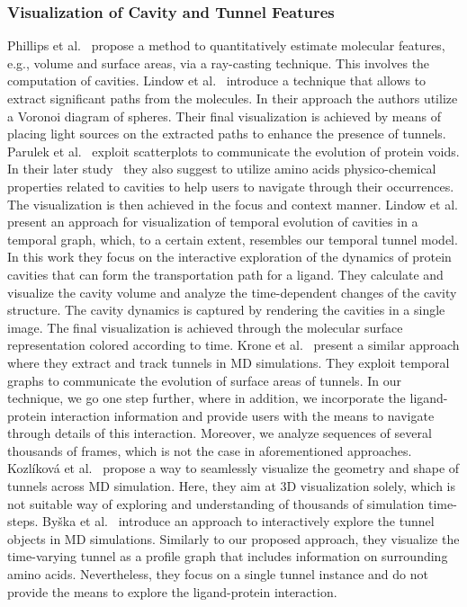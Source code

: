 \documentclass[twocolumn]{bmcart}%
\begin{document}
\subsubsection*{Visualization of Cavity and Tunnel Features}
Phillips et al.~\cite{phillips2010} propose a method to quantitatively estimate molecular features, e.g., volume and surface areas, via a ray-casting technique. 
This involves the computation of cavities.
Lindow et al.~\cite{LindowBH11} introduce a technique that allows to extract significant paths from the molecules. 
In their approach the authors utilize a Voronoi diagram of spheres. 
Their final visualization is achieved by means of placing light sources on the extracted paths to enhance the presence of tunnels.
Parulek et al.~\cite{parulek2012} exploit scatterplots to communicate the evolution of protein voids. 
In their later study~\cite{parulek2013} they also suggest to utilize amino acids physico-chemical properties related to cavities to help users to navigate through their occurrences. 
The visualization is then achieved in the focus and context manner.
Lindow et al. \cite{Lindow2013} present an approach for visualization of temporal evolution of cavities in a temporal graph, which, to a certain extent, resembles our temporal tunnel model. 
In this work they focus on the interactive exploration of the dynamics of protein cavities that can form the transportation path for a ligand. 
They calculate and visualize the cavity volume and analyze the time-dependent changes of the cavity structure.
The cavity dynamics is captured by rendering the cavities in a single image. 
The final visualization is achieved through the molecular surface representation colored according to time. 
Krone et al.~\cite{krone2013features} present a similar approach where they extract and track tunnels in MD simulations. 
They exploit temporal graphs to communicate the evolution of surface areas of tunnels. 
In our technique, we go one step further, where in addition, we incorporate the ligand-protein interaction information and provide users with the means to navigate through details of this interaction. 
Moreover, we analyze sequences of several thousands of frames, which is not the case in aforementioned approaches.
Kozl\'{i}kov\'{a} et al.~\cite{kozlikova2014vcbm} propose a way to seamlessly visualize the geometry and shape of tunnels across MD simulation. 
Here, they aim at 3D visualization solely, which is not suitable way of exploring and understanding of thousands of simulation time-steps.
By\v{s}ka et al.~\cite{byska2016} introduce an approach to interactively explore the tunnel objects in MD simulations. 
Similarly to our proposed approach, they visualize the time-varying tunnel as a profile graph that includes information on surrounding amino acids. 
Nevertheless, they focus on a single tunnel instance and do not provide the means to explore the ligand-protein interaction.
\end{document}

